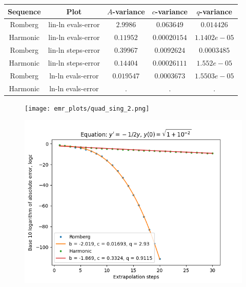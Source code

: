 \begin{table}[H]
    \centering
    \begin{tabular}{c|c||c|c|c}
Sequence & Plot & \(A\)-variance & \(c\)-variance & \(q\)-variance\\\hline
Romberg & lin-ln evals-error & \(2.9986\) & \(0.063649\) & \(0.014426\) \\
Harmonic & lin-ln evals-error & \(0.11952\) & \(0.00020154\) & \(1.1402e-05\) \\
Romberg & lin-ln steps-error & \(0.39967\) & \(0.0092624\) & \(0.0003485\) \\
Harmonic & lin-ln steps-error & \(0.14404\) & \(0.00026111\) & \(1.552e-05\) \\
Romberg & ln-ln evals-error & \(0.019547\) & \(0.0003673\) & \(1.5503e-05\) \\
Harmonic & ln-ln evals-error & . & . & . \\
    \end{tabular}
    \label{tab:my_label}
\end{table}

\begin{figure}[H]
\centering
\begin{minipage}{0.45\textwidth}
\centering
\texttt{[image: emr\_plots/quad\_sing\_2.png]}
\end{minipage}
\begin{minipage}{0.45\textwidth}
\centering
\includegraphics[scale=0.45]{emr_plots/quad_sing_2_hp_steps.png}
\end{minipage}
\end{figure}

